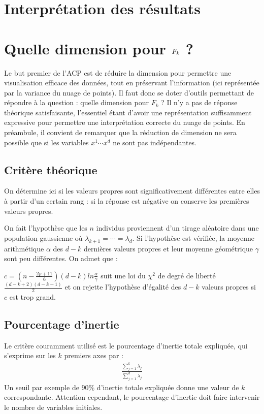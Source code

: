 \documentclass[letterpaper,10pt,french]{sphinxmanual}
\begin{document}
\section{Interprétation des résultats}
\label{\detokenize{acp:interpretation-des-resultats}}

\section{Quelle dimension pour \protect\(F_k\protect\) ?}
\label{\detokenize{acp:quelle-dimension-pour-f-k}}
\sphinxAtStartPar
Le but premier de l’ACP est de réduire la dimension pour permettre une visualisation efficace des données, tout en préservant l’information (ici représentée par la variance du nuage de points).  Il faut donc se doter d’outils permettant de répondre à la question : quelle dimension pour \(F_k\) ? Il n’y a pas de réponse théorique satisfaisante, l’essentiel étant d’avoir une représentation suffisamment expressive pour permettre une interprétation correcte du nuage de points.
En préambule, il convient de remarquer que la réduction de dimension ne sera possible que si les variables \(x^1\cdots x^d\) ne sont pas indépendantes.


\subsection{Critère théorique}
\label{\detokenize{acp:critere-theorique}}
\sphinxAtStartPar
On détermine ici si les valeurs propres sont significativement différentes entre elles à partir d’un certain rang : si la réponse est négative on conserve les
premières valeurs propres.

\sphinxAtStartPar
On fait l’hypothèse que les \(n\) individus proviennent d’un tirage aléatoire dans une population gaussienne  où \(\lambda_{k+1}=\cdots =\lambda_{d}\). Si l’hypothèse est vérifiée, la moyenne arithmétique \(\alpha\) des \(d-k\) dernières valeurs propres et leur moyenne géométrique \(\gamma\) sont peu différentes. On admet que :

\sphinxAtStartPar
\(c=\left ( n-\frac{2p+11}{6}\right )(d-k) ln\frac{\alpha}{\gamma}\)
suit une loi du \(\chi^2\) de degré de liberté \(\frac{(d-k+2)(d-k-1)}{2}\) et on rejette l’hypothèse d’égalité des \(d-k\) valeurs propres si \(c\) est trop grand.


\subsection{Pourcentage d’inertie}
\label{\detokenize{acp:pourcentage-d-inertie}}
\sphinxAtStartPar
Le critère couramment utilisé est le pourcentage d’inertie totale expliquée, qui s’exprime sur les \(k\) premiers axes par :
\begin{equation*}
\begin{split}\frac{\displaystyle\sum_{j=1}^k \lambda_j}{\displaystyle\sum_{j=1}^d \lambda_j}\end{split}
\end{equation*}
\sphinxAtStartPar
Un seuil par exemple de 90\% d’inertie totale expliquée donne une valeur de \(k\) correspondante. Attention cependant, le pourcentage d’inertie doit faire intervenir le nombre de variables initiales.
\end{document}
